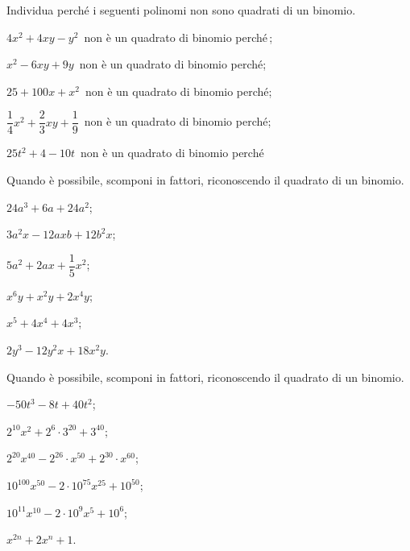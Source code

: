 \begin{esercizio}
\label{ese:13.42}
Individua perché i seguenti polinomi non sono quadrati di un binomio.
\begin{enumeratea}
 \item $4x^{2}+4xy-y^{2}$\, non è un quadrato di binomio perché\,\dotfill;
 \item $x^{2}-6xy+9y$\, non è un quadrato di binomio perché\dotfill;
 \item $25+100x+x^{2}$\, non è un quadrato di binomio perché\dotfill;
 \item $\dfrac{1}{4}x^{2}+\dfrac{2}{3}xy+\dfrac{1}{9}$\, non è un quadrato di binomio perché\dotfill;
 \item $25t^{2}+4-10t$\, non è un quadrato di binomio perché\dotfill
\end{enumeratea}
\end{esercizio}
\pagebreak
\begin{esercizio}[\Ast]
\label{ese:13.43}
Quando è possibile, scomponi in fattori, riconoscendo il quadrato di un binomio.
\begin{multicols}{3}
\begin{enumeratea}
 \item $24a^{3}+6a+24a^{2}$;
 \item $3a^{2}x-12axb+12b^{2}x$;
 \item $5a^{2}+2ax+\dfrac{1}{5}x^{2}$;
 \item $x^{6}y+x^{2}y+2x^{4}y$;
 \item $x^{5}+4x^{4}+4x^{3}$;
 \item $2y^{3}-12y^{2}x+18x^{2}y$.
\end{enumeratea}
\end{multicols}
\end{esercizio}

\begin{esercizio}[\Ast]
\label{ese:13.44}
Quando è possibile, scomponi in fattori, riconoscendo il quadrato di un binomio.
\begin{multicols}{2}
\begin{enumeratea}
 \item $-50t^{3}-8t+40t^{2}$;
 \item $2^{10}x^{2}+2^{6}\cdot 3^{20}+3^{40}$;
 \item $2^{20}x^{40}-2^{26}\cdot x^{50}+2^{30}\cdot x^{60}$;
 \item $10^{100}x^{50}-2\cdot 10^{75}x^{25}+10^{50}$;
 \item $10^{11}x^{10}-2\cdot 10^{9}x^{5}+10^{6}$;
 \item $x^{2n}+2x^{n}+1$.
\end{enumeratea}
\end{multicols}
\end{esercizio}

